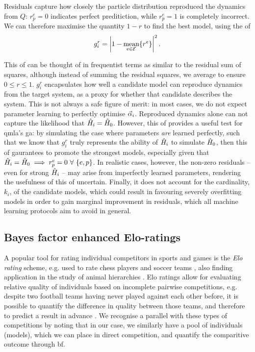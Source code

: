 Residuals capture how closely the particle distribution reproduced the dynamics from $Q$:
    $r^{e}_{p} = 0$ indicates perfect preditiction, while $r^e_p=1$ is completely incorrect. 
We can therefore maximise the quantity $1-r$ to find    the best model, 
    using the \gls{of}
\begin{equation}
    \label{eqn:residual_fitness}
    g^r_i = \left| 1 - \underset{e \in { \mathcal{E} }}{\text{mean}}\{ {r^e} \}\right|^2.
\end{equation}
\par     
This \gls{of} can be thought of in frequentist terms 
    as similar to the residual sum of squares,
    although instead of summing the residual squares, we average to ensure $0 \leq r \leq 1$. 
$g_i^r$ encapsulates how well a candidate model can reproduce dynamics 
    from the target system, as a proxy for whether that candidate describes the system. 
This is not always a safe figure of merit: 
    in most cases, we do not expect parameter learning to perfectly optimise $\vec{\alpha}_i$. 
Reproduced dynamics alone can not capture the likelihood that $\hat{H}_i=\hat{H}_0$. 
However, this \gls{of} provides a useful test for \gls{qmla}'s \gls{ga}:
    by simulating the case where parameters \emph{are} learned perfectly, 
    such that we know that $g_i^r$ truly represents the ability of $\hat{H}_i$ to 
    simulate $\hat{H}_0$, then this \gls{of} gaurantees to promote  the strongest models,
    especially given that $\hat{H}_i=\hat{H}_0 \implies r_p^e=0 \ \forall \ \{e, p\}$. 
In realistic cases, however, the non-zero residuals -- even for 
    strong $\hat{H}_i$ -- may arise from imperfectly learned parameters,
    rendering the usefulness of this \gls{of} uncertain. 
Finally, it does not account for the cardinality, $k_i$, of the candidate models, 
    which could result in favouring severely overfitting models in order to gain marginal improvement 
    in residuals, which all machine learning protocols aim to avoid in general.

\subsection{Bayes factor enhanced Elo-ratings}\label{sec:elo}
A popular tool for rating individual competitors in sports and games is the \emph{Elo rating} scheme, 
    e.g. used to rate chess players and soccer teams \cite{elo1978rating, fifa_elo}, 
    also finding application in the study of animal hierarchies \cite{neumann2011assessing}. 
Elo ratings allow for evaluating relative quality of individuals 
    based on incomplete pairwise competitions, 
    e.g. despite two football teams having never played against each other before, 
    it is possible to quantify the difference in quality between those teams, 
    and therefore to predict a result in advance \cite{hvattum2010using}. 
We recognise a parallel with these types of competitions by noting that
    in our case, we similarly have a pool of individuals (models), 
    which we can place in direct competition, and quantify the comparitive outcome through \gls{bf}. 

